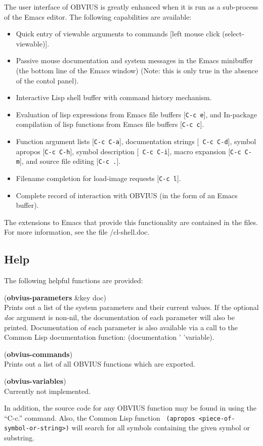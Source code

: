 The user interface of OBVIUS is greatly enhanced when it is run as a
sub-process of the Emacs editor.  The following capabilities are available:
\begin{itemize}
\item Quick entry of viewable arguments to commands [left
mouse click (select-viewable)].
\item Passive mouse documentation and system messages in the Emacs
minibuffer (the bottom line of the Emacs window) (Note: this is only
true in the absence of the contol panel).
\item Interactive Lisp shell buffer with command history mechanism.
\item Evaluation of lisp expressions from Emacs file buffers [{\tt C-c
e}], and In-package compilation of lisp functions from Emacs file
buffers [{\tt C-c c}].
\item Function argument lists [{\tt C-c C-a}], documentation strings [{\tt
C-c C-d}], symbol apropos [{\tt C-c C-h}], symbol description [{\tt
C-c C-i}], macro expansion [{\tt C-c C-m}], and source file editing
[{\tt C-c .}].
\item Filename completion for load-image requests [{\tt C-c l}].
\item Complete record of interaction with OBVIUS (in the form of an
Emacs buffer).
\end{itemize}

The extensions to Emacs that provide this functionality are contained
in the  files.  For more information, see the file
/cl-shell.doc.

\subsection{Help}
\label{sec:help}

The following helpful functions are provided:
\begin{description}
\item ({\bf obvius-parameters} \&key doc) \\
Prints out a list of the system
parameters and their current values.  If the optional {\em doc}
argument is non-nil, the documentation of each parameter will also be
printed. Documentation of each parameter is also
available via a call to the Common Lisp documentation function:
(documentation ' 'variable).
\item ({\bf obvius-commands}) \\
Prints out a list of all OBVIUS functions which are exported.
\item ({\bf obvius-variables}) \\ 
Currently not implemented.
\end{description}
In addition, the source code for any OBVIUS function may be found in
using the ``C-c.'' command.  Also, the Common Lisp function {\tt
(apropos <piece-of-symbol-or-string>)} will search for all symbols
containing the given symbol or substring.
